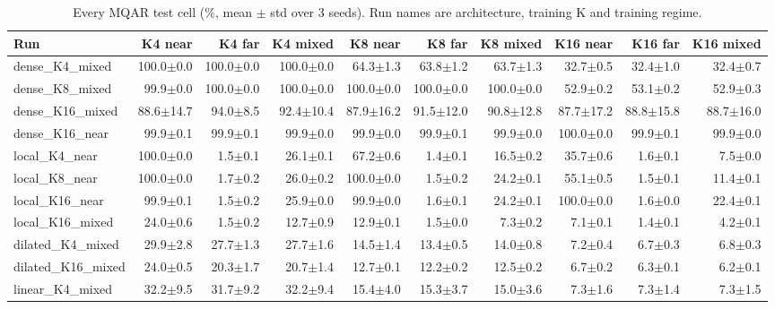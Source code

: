 \begin{table}[!htb]
\centering
\scriptsize
\setlength{\tabcolsep}{3.5pt}
\caption{Every MQAR test cell (\%, mean $\pm$ std over 3 seeds). Run names are architecture, training K and training regime.}
\label{tab:t2bgrid}
\begin{adjustbox}{max width=\linewidth}
\begin{tabular}{lrrrrrrrrr}
\toprule
Run & K4 near & K4 far & K4 mixed & K8 near & K8 far & K8 mixed & K16 near & K16 far & K16 mixed \\
\midrule
dense\_K4\_mixed & 100.0$\pm$0.0 & 100.0$\pm$0.0 & 100.0$\pm$0.0 & 64.3$\pm$1.3 & 63.8$\pm$1.2 & 63.7$\pm$1.3 & 32.7$\pm$0.5 & 32.4$\pm$1.0 & 32.4$\pm$0.7 \\
dense\_K8\_mixed & 99.9$\pm$0.0 & 100.0$\pm$0.0 & 100.0$\pm$0.0 & 100.0$\pm$0.0 & 100.0$\pm$0.0 & 100.0$\pm$0.0 & 52.9$\pm$0.2 & 53.1$\pm$0.2 & 52.9$\pm$0.3 \\
dense\_K16\_mixed & 88.6$\pm$14.7 & 94.0$\pm$8.5 & 92.4$\pm$10.4 & 87.9$\pm$16.2 & 91.5$\pm$12.0 & 90.8$\pm$12.8 & 87.7$\pm$17.2 & 88.8$\pm$15.8 & 88.7$\pm$16.0 \\
dense\_K16\_near & 99.9$\pm$0.1 & 99.9$\pm$0.1 & 99.9$\pm$0.0 & 99.9$\pm$0.0 & 99.9$\pm$0.1 & 99.9$\pm$0.0 & 100.0$\pm$0.0 & 99.9$\pm$0.1 & 99.9$\pm$0.0 \\
local\_K4\_near & 100.0$\pm$0.0 & 1.5$\pm$0.1 & 26.1$\pm$0.1 & 67.2$\pm$0.6 & 1.4$\pm$0.1 & 16.5$\pm$0.2 & 35.7$\pm$0.6 & 1.6$\pm$0.1 & 7.5$\pm$0.0 \\
local\_K8\_near & 100.0$\pm$0.0 & 1.7$\pm$0.2 & 26.0$\pm$0.2 & 100.0$\pm$0.0 & 1.5$\pm$0.2 & 24.2$\pm$0.1 & 55.1$\pm$0.5 & 1.5$\pm$0.1 & 11.4$\pm$0.1 \\
local\_K16\_near & 99.9$\pm$0.1 & 1.5$\pm$0.2 & 25.9$\pm$0.0 & 99.9$\pm$0.0 & 1.6$\pm$0.1 & 24.2$\pm$0.1 & 100.0$\pm$0.0 & 1.6$\pm$0.0 & 22.4$\pm$0.1 \\
local\_K16\_mixed & 24.0$\pm$0.6 & 1.5$\pm$0.2 & 12.7$\pm$0.9 & 12.9$\pm$0.1 & 1.5$\pm$0.0 & 7.3$\pm$0.2 & 7.1$\pm$0.1 & 1.4$\pm$0.1 & 4.2$\pm$0.1 \\
dilated\_K4\_mixed & 29.9$\pm$2.8 & 27.7$\pm$1.3 & 27.7$\pm$1.6 & 14.5$\pm$1.4 & 13.4$\pm$0.5 & 14.0$\pm$0.8 & 7.2$\pm$0.4 & 6.7$\pm$0.3 & 6.8$\pm$0.3 \\
dilated\_K16\_mixed & 24.0$\pm$0.5 & 20.3$\pm$1.7 & 20.7$\pm$1.4 & 12.7$\pm$0.1 & 12.2$\pm$0.2 & 12.5$\pm$0.2 & 6.7$\pm$0.2 & 6.3$\pm$0.1 & 6.2$\pm$0.1 \\
linear\_K4\_mixed & 32.2$\pm$9.5 & 31.7$\pm$9.2 & 32.2$\pm$9.4 & 15.4$\pm$4.0 & 15.3$\pm$3.7 & 15.0$\pm$3.6 & 7.3$\pm$1.6 & 7.3$\pm$1.4 & 7.3$\pm$1.5 \\

\end{tabular}
\end{adjustbox}
\end{table}
